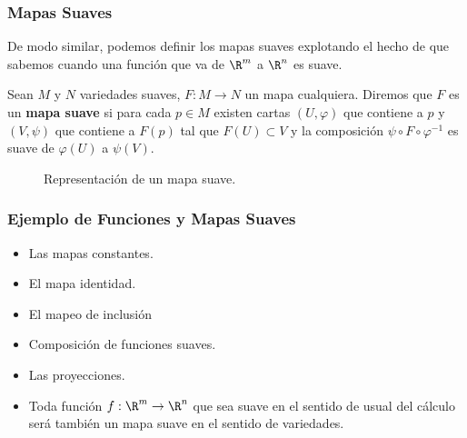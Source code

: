 \begin{frame}
\frametitle{Mapas Suaves}
  De modo similar, podemos definir los mapas suaves explotando el hecho de que sabemos cuando una función que va de $\R^m$ a $\R^n$ es suave. \pause

\begin{definition}
  Sean $M$ y $N$ variedades suaves, $F: M \to N$ un mapa cualquiera. Diremos que $F$ es un \textbf{mapa suave} si para cada $p \in M$ existen cartas $(U,\varphi)$ que contiene a $p$ y $(V,\psi)$ que contiene a $F(p)$ tal que $F(U)\subset V$ y la composición $\psi \circ F \circ \varphi^{-1}$ es suave de $\varphi(U)$ a $\psi(V)$.
\end{definition}
\end{frame}

\begin{frame}
  \begin{figure}
    \scalebox{.70}{}
    \caption{Representación de un mapa suave.}
  \end{figure}
\end{frame}

\begin{frame}
\frametitle{Ejemplo de Funciones y Mapas Suaves}
  \begin{itemize}
    \item Las mapas constantes.
    \item El mapa identidad.
    \item El mapeo de inclusión
    \item Composición de funciones suaves.
    \item Las proyecciones.
    \item Toda función $f: \R^m \to \R^n$ que sea suave en el sentido de usual del cálculo será también un mapa suave en el sentido de variedades.
  \end{itemize}
\end{frame}

